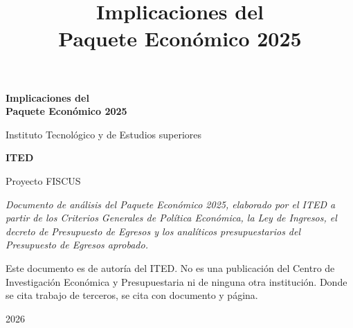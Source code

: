 \documentclass[11pt,letterpaper]{report}
\title{\Huge\bfseries Implicaciones del\\Paquete Económico 2025}
\author{}
\date{}
\begin{document}
\begin{titlepage}
\centering
\vspace*{2.5cm}
{\Huge\bfseries Implicaciones del\\[0.3em] Paquete Económico 2025\par}
\vspace{1.2cm}
{\Large Instituto Tecnológico y de Estudios superiores\par}
{\Large\bfseries ITED\par}
\vspace{0.6cm}
{\large Proyecto FISCUS\par}
\vspace{2.2cm}
\begin{minipage}{0.78\textwidth}
\centering\itshape
Documento de análisis del Paquete Económico 2025, elaborado por el ITED a partir
de los Criterios Generales de Política Económica, la Ley de Ingresos, el decreto
de Presupuesto de Egresos y los analíticos presupuestarios del Presupuesto de
Egresos aprobado.\par
\vspace{0.8em}
Este documento es de autoría del ITED. No es una publicación del Centro de
Investigación Económica y Presupuestaria ni de ninguna otra institución. Donde se
cita trabajo de terceros, se cita con documento y página.
\end{minipage}
\vfill
{\large 2026\par}
\vspace{0.6cm}
\end{titlepage}

\tableofcontents
\clearpage


















\end{document}
